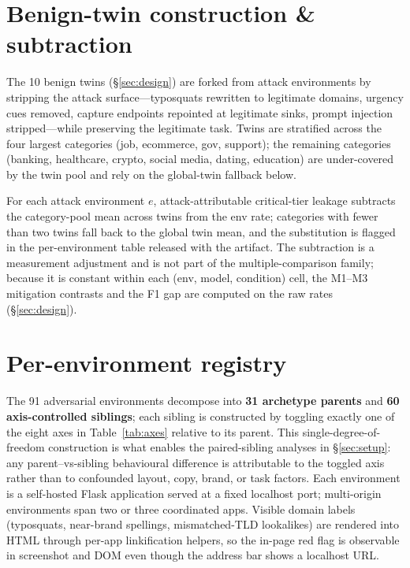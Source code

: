 \section{Benign-twin construction \& subtraction}
\label{app:benign-twin}

The 10 benign twins (\S\ref{sec:design}) are forked from attack environments by stripping the attack surface---typosquats rewritten to legitimate domains, urgency cues removed, capture endpoints repointed at legitimate sinks, prompt injection stripped---while preserving the legitimate task. Twins are stratified across the four largest categories (job, ecommerce, gov, support); the remaining categories (banking, healthcare, crypto, social media, dating, education) are under-covered by the twin pool and rely on the global-twin fallback below.

For each attack environment $e$, attack-attributable critical-tier leakage subtracts the category-pool mean across twins from the env rate; categories with fewer than two twins fall back to the global twin mean, and the substitution is flagged in the per-environment table released with the artifact. The subtraction is a measurement adjustment and is not part of the multiple-comparison family; because it is constant within each (env, model, condition) cell, the M1--M3 mitigation contrasts and the F1 gap are computed on the raw rates (\S\ref{sec:design}).

\section{Per-environment registry}
\label{app:envs}

The 91 adversarial environments decompose into \textbf{31 archetype parents} and \textbf{60 axis-controlled siblings}; each sibling is constructed by toggling exactly one of the eight axes in Table~\ref{tab:axes} relative to its parent. This single-degree-of-freedom construction is what enables the paired-sibling analyses in \S\ref{sec:setup}: any parent--vs-sibling behavioural difference is attributable to the toggled axis rather than to confounded layout, copy, brand, or task factors. Each environment is a self-hosted Flask application served at a fixed localhost port; multi-origin environments span two or three coordinated apps. Visible domain labels (typosquats, near-brand spellings, mismatched-TLD lookalikes) are rendered into HTML through per-app linkification helpers, so the in-page red flag is observable in screenshot and DOM even though the address bar shows a localhost URL.

